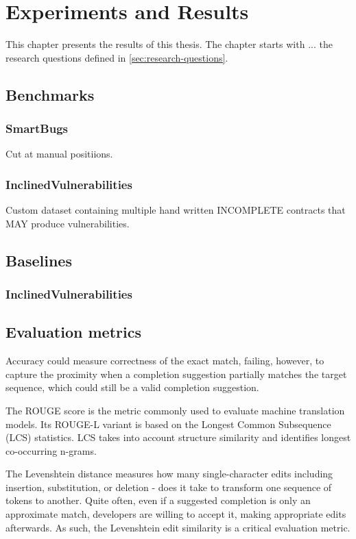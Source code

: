 
\chapter{Experiments and Results}
\label{chap:results}
This chapter presents the results of this thesis. The chapter starts with ... the research questions defined in \cref{sec:research-questions}.

\section{Benchmarks}

\subsection{SmartBugs}
Cut at manual positiions.

\subsection{InclinedVulnerabilities}
Custom dataset containing multiple hand written INCOMPLETE contracts that MAY produce vulnerabilities.


\section{Baselines}
\subsection{InclinedVulnerabilities}

\section{Evaluation metrics}
Accuracy could measure correctness of the exact match, failing, however, to capture the proximity when a completion suggestion partially matches the target sequence, which could still be a valid completion suggestion.

The ROUGE score is the metric commonly used to evaluate machine translation models. Its ROUGE-L variant is based on the Longest Common Subsequence (LCS) statistics. LCS takes into account structure similarity and identifies longest co-occurring n-grams.

The Levenshtein distance measures how many single-character edits  including insertion, substitution, or deletion - does it take to transform one sequence of tokens to another. Quite often, even if a suggested completion is only an approximate match, developers are willing to accept it, making appropriate edits afterwards. As such, the Levenshtein edit similarity is a critical evaluation metric.



